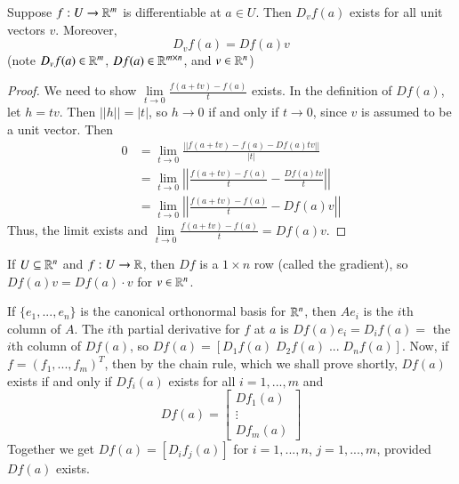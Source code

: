 \begin{proposition}
    Suppose $f:U\rightarrow \mathbb R^m$ is differentiable at $a \in U$. Then $D_vf(a)$ exists for all unit vectors $v$. Moreover, $$D_vf(a) = Df(a)v$$ (note $D_vf(a) \in \mathbb R^m$, $Df(a) \in \mathbb R^{m\times n}$, and $v \in \mathbb R^n$)
\end{proposition}
\begin{proof}
    We need to show $\lim\limits_{t\rightarrow 0}\frac{f(a+tv)-f(a)}{t}$ exists. In the definition of $Df(a)$, let $h = tv$. Then $||h|| = |t|$, so $h\rightarrow 0$ if and only if $t\rightarrow 0$, since $v$ is assumed to be a unit vector. Then \begin{align*}
        0 &= \lim\limits_{t\rightarrow 0}\frac{||f(a+tv) - f(a) - Df(a)tv||}{|t|} \\
        &= \lim\limits_{t\rightarrow 0}\left|\left|\frac{f(a+tv) - f(a)}{t} - \frac{Df(a)tv}{t}\right|\right| \\
        &= \lim\limits_{t\rightarrow 0}\left|\left|\frac{f(a+tv)-f(a)}{t} - Df(a)v\right|\right|
    \end{align*}
    Thus, the limit exists and $\lim\limits_{t\rightarrow 0}\frac{f(a+tv)-f(a)}{t} = Df(a)v$.
\end{proof}

\begin{example}
    If $U \subseteq \mathbb R^n$ and $f:U\rightarrow \mathbb R$, then $Df$ is a $1\times n$ row (called the gradient), so $Df(a)v = Df(a)\cdot v$ for $v \in \mathbb R^n$.
\end{example}

If $\{e_1,...,e_n\}$ is the canonical orthonormal basis for $\mathbb R^n$, then $Ae_i$ is the $i$th column of $A$. The $i$th partial derivative for $f$ at $a$ is $Df(a)e_i = D_if(a) = $ the $i$th column of $Df(a)$, so $Df(a) = [D_1f(a)\;D_2f(a)\;...\;D_nf(a)]$. Now, if $f = (f_1,...,f_m)^T$, then by the chain rule, which we shall prove shortly, $Df(a)$ exists if and only if $Df_i(a)$ exists for all $i = 1,...,m$ and $$Df(a) = \begin{bmatrix} Df_1(a) \\ \vdots \\ Df_m(a)\end{bmatrix}$$ Together we get $Df(a) = [D_if_j(a)]$ for $i = 1,...,n$, $j = 1,...,m$, provided $Df(a)$ exists.


